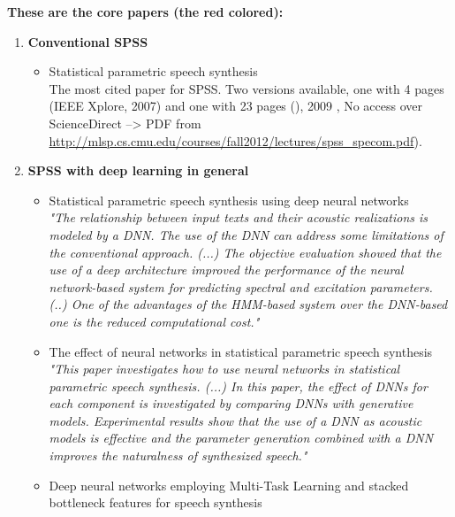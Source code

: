 \iffalse
\vspace{2em}
\textbf{\large These are the core papers (the red colored):}
\vspace{1em}
\begin{enumerate}[leftmargin=16pt]
	\item \textbf{Conventional \ac{SPSS}}
	\begin{itemize}[leftmargin=10pt]
		\item \textcolor{ACMRed}{Statistical parametric speech synthesis} \cite{zen:statistical}\\
		The most cited paper for \ac{SPSS}. Two versions available, one with 4 pages (IEEE Xplore, 2007) and one with 23 pages ()\cite{zen:statistical}, 2009 , No access over ScienceDirect --> PDF from \url{http://mlsp.cs.cmu.edu/courses/fall2012/lectures/spss_specom.pdf}).
	\end{itemize}
	\vspace{1em}
	\item \textbf{\ac{SPSS} with deep learning in general}
	\begin{itemize}[leftmargin=10pt]
		\item \textcolor{ACMRed}{Statistical parametric speech synthesis using deep neural networks} \cite{zen:deepstatistical}\\
		\textit{"The relationship between input texts and their acoustic realizations is modeled by a DNN. The use of the DNN can address some limitations of the conventional approach. (...) The objective evaluation showed that the use of a deep architecture improved the performance of the neural network-based system for predicting spectral and excitation parameters. (..) One of the advantages of the HMM-based system over the DNN-based one is the reduced computational cost."}
		\item \textcolor{ACMRed}{The effect of neural networks in statistical parametric speech synthesis} \cite{hashimoto:effect}\\
		\textit{"This paper investigates how to use neural networks in statistical parametric speech synthesis. (...) In this paper, the effect of DNNs for each component is investigated by comparing DNNs with generative models. Experimental results show that the use of a DNN as acoustic models is effective and the parameter generation combined with a DNN improves the naturalness of synthesized speech."}
		\item \textcolor{black!40}{Deep neural networks employing Multi-Task Learning and stacked bottleneck features for speech synthesis \cite{wu:deep}}

\end{itemize}
\end{enumerate}
